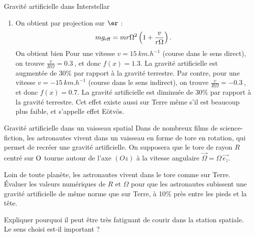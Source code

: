 \begin{exo}[PC][2][oral]{Gravité artificielle dans Interstellar}
{\begin{liste}
\begin{enumerate}
$$      $$
      \item On obtient par projection sur $\er$ :
      $$
      m g_{\rm{eff}} = mr\Omega^2\left( 1 + \frac{v}{r\Omega} \right).
      $$
      On obtient bien
      Pour une vitesse $v = \SI{15}{km.h^{-1}}$ (course dans le sens direct), on trouve $\textstyle\frac{v}{R\Omega} = \SI{0.3}{}$, et donc $f(x) = \num{1.3}$. La gravité artificielle est augmentée de 30\% par rapport à la gravité terrestre. Par contre, pour une vitesse $v = -\SI{15}{km.h^{-1}}$ (course dans le sens indirect), on trouve $\textstyle\frac{v}{R\Omega} = -\SI{0.3}{}$, et donc $f(x) = \num{0.7}$. La gravité artificielle est diminuée de 30\% par rapport à la gravité terrestre. Cet effet existe aussi sur Terre même s'il est beaucoup plus faible, et s'appelle effet Eötvös.
    \end{enumerate}
  \end{liste}
}

  \end{exo}

\begin{exo}[PC][2][colle]{Gravité artificielle dans un vaisseau spatial}
Dans de nombreux films de science-fiction, les astronautes vivent dans un vaisseau en forme de tore en rotation, qui permet de recréer une gravité artificielle. On supposera que le tore de rayon $R$ centré sur $\rm O$ tourne autour de l'axe $(Oz)$ à la vitesse angulaire $\Vec{\Omega}=\Omega\,\Vec{e_z}$.

\begin{quest}
\item Loin de toute planète, les astronautes vivent dans le tore comme sur Terre. Évaluer les valeurs numériques de $R$ et $\Omega$ pour que les astronautes subissent une gravité artificielle de même norme que sur Terre, à 10\% près entre les pieds et la tête.


\item Expliquer pourquoi il peut être très fatiguant de courir dans la station spatiale. Le sens choisi est-il important ?


\end{quest}
\end{exo}


